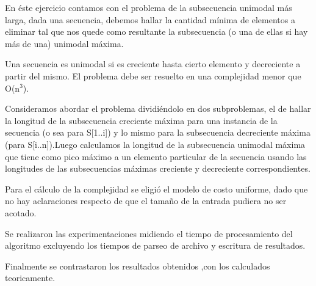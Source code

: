En éste ejercicio contamos con el problema de la subsecuencia unimodal más larga, dada una secuencia, debemos hallar la cantidad mínima de elementos a eliminar tal que nos quede como resultante la subsecuencia (o una de ellas si hay más de una) unimodal máxima.

Una secuencia es unimodal si es creciente hasta cierto elemento y decreciente a partir del mismo.
El problema debe ser resuelto en una complejidad menor que O(n$^{3}$).

Consideramos abordar el problema dividiéndolo en dos subproblemas, el de hallar la longitud de la subsecuencia creciente máxima para una instancia de la secuencia (o sea para S[1..i]) y lo mismo para la subsecuencia decreciente máxima (para S[i..n]).Luego calculamos la longitud de la subsecuencia unimodal máxima que tiene como pico máximo a un elemento particular de la secuencia usando las longitudes de las subsecuencias máximas creciente y decreciente correspondientes.

Para el cálculo de la complejidad se eligió el modelo de costo uniforme, dado que no hay aclaraciones respecto de que el tamaño de la entrada pudiera no ser acotado.

Se realizaron las experimentaciones midiendo el tiempo de procesamiento del algoritmo excluyendo los tiempos de parseo de archivo y escritura de resultados.

Finalmente se contrastaron los resultados obtenidos ,con los calculados teoricamente. 